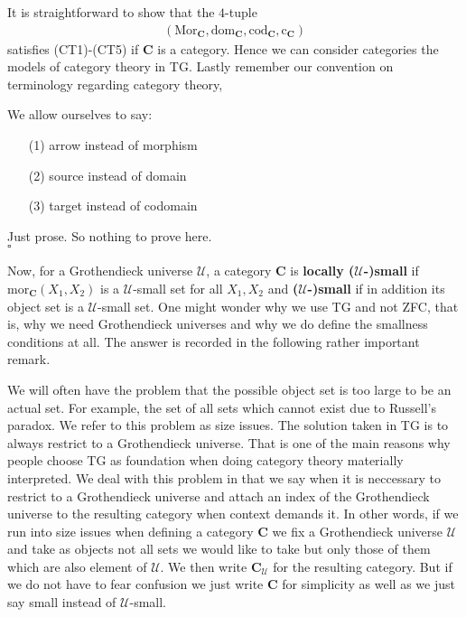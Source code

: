 It is straightforward to show that the $4$-tuple
\begin{align*}
  \left(
    \mathrm{Mor}_{\mathbf{C}},
    \mathrm{dom}_{\mathbf{C}},
    \mathrm{cod}_{\mathbf{C}},
    \mathrm{c}_{\mathbf{C}}
  \right)
\end{align*}
satisfies (CT1)-(CT5) if $\mathbf{C}$ is a category. Hence we can consider categories the models of category theory in TG. Lastly remember our convention on terminology regarding category theory,
\\
\begin{rem}
\label{rem:cattheoryterm}
We allow ourselves to say:
\begin{enumerate}
\item[(1)]
arrow instead of morphism
\item[(2)]
source instead of domain
\item[(3)]
target instead of codomain
\end{enumerate}
\end{rem}
\begin{prf}
Just prose. So nothing to prove here.
\\
\phantom{proven}
\hfill
$\square$
\end{prf}
Now, for a Grothendieck universe $\mathcal{U}$, a category $\mathbf{C}$ is \textbf{locally ($\mathcal{U}$-)small} if $\mathrm{mor}_{\mathbf{C}}(X_{1},X_{2})$ is a $\mathcal{U}$-small set for all $X_{1},X_{2}$ and \textbf{($\mathcal{U}$-)small} if in addition its object set is a $\mathcal{U}$-small set. One might wonder why we use TG and not ZFC, that is, why we need Grothendieck universes and why we do define the smallness conditions at all. The answer is recorded in the following rather important remark.
\\
\begin{rem}
\label{rem:techcat}
We will often have the problem that the possible object set is too large to be an actual set. For example, the set of all sets which cannot exist due to Russell's paradox. We refer to this problem as {\glqq}size issues{\grqq}. The solution taken in TG is to always restrict to a Grothendieck universe. That is one of the main reasons why people choose TG as foundation when doing category theory materially interpreted. We deal with this problem in that we say when it is neccessary to restrict to a Grothendieck universe and attach an index of the Grothendieck universe to the resulting category when context demands it. In other words, if we run into size issues when defining a category $\mathbf{C}$ we fix a Grothendieck universe $\mathcal{U}$ and take as objects not all sets we would like to take but only those of them which are also element of $\mathcal{U}$. We then write $\mathbf{C}_{\mathcal{U}}$ for the resulting category. But if we do not have to fear confusion we just write $\mathbf{C}$ for simplicity as well as we just say small instead of $\mathcal{U}$-small.
\end{rem}
